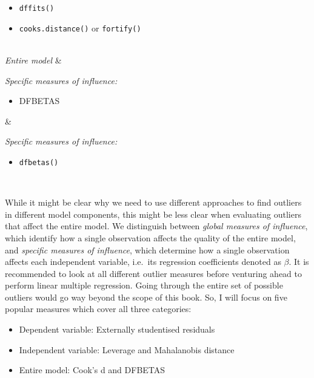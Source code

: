 \documentclass[
  letterpaper,
  DIV=11,
  numbers=noendperiod]{scrreprt}
\providecommand{\tightlist}{%
  \setlength{\itemsep}{0pt}\setlength{\parskip}{0pt}}\usepackage{longtable,booktabs,array}
\begin{document}
\begin{longtable}[]
\begin{minipage}[t]{\linewidth}
\begin{itemize}
\item
  \texttt{dffits()}
\item
  \texttt{cooks.distance()} or \texttt{fortify()}
\end{itemize}
\end{minipage} \\
\emph{Entire model} & \begin{minipage}[t]{\linewidth}\raggedright
\emph{Specific measures of influence:}

\begin{itemize}
\tightlist
\item
  DFBETAS
\end{itemize}
\end{minipage} & \begin{minipage}[t]{\linewidth}\raggedright
\emph{Specific measures of influence:}

\begin{itemize}
\tightlist
\item
  \texttt{dfbetas()}
\end{itemize}
\end{minipage} \\
\end{longtable}

While it might be clear why we need to use different approaches to find
outliers in different model components, this might be less clear when
evaluating outliers that affect the entire model. We distinguish between
\emph{global measures of influence}, which identify how a single
observation affects the quality of the entire model, and \emph{specific
measures of influence}, which determine how a single observation affects
each independent variable, i.e.~its regression coefficients denoted as
\(\beta\). It is recommended to look at all different outlier measures
before venturing ahead to perform linear multiple regression. Going
through the entire set of possible outliers would go way beyond the
scope of this book. So, I will focus on five popular measures which
cover all three categories:

\begin{itemize}
\item
  Dependent variable: Externally studentised residuals
\item
  Independent variable: Leverage and Mahalanobis distance
\item
  Entire model: Cook's d and DFBETAS
\end{itemize}
\end{document}
